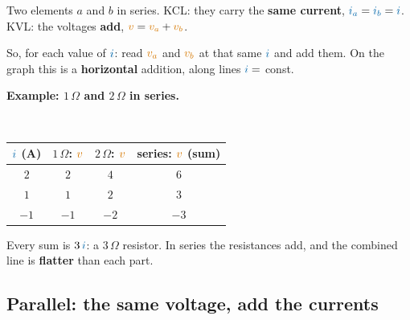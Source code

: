 \documentclass[11pt,a4paper]{article}
\newcommand{\Icol}[1]{\textcolor{ccur}{#1}}
\newcommand{\Vcol}[1]{\textcolor{cvolt}{#1}}
\newcommand{\ohm}{\,\Omega}
\newcommand{\minic}[3]{%
  \begin{scope}[shift={(#1-0.55,1.75)}, scale=\miniscale, transform shape]
    \draw (0,#2) node[ocirc] {}; \draw (0,0) node[ocirc] {};
    #3
  \end{scope}}
\newcommand{\mlab}[1]{{\Large #1}}
\newcommand{\miniscale}{0.62}
\newcommand{\mR}[4]{\draw (#1,#2) to[R, l=\mlab{#4}] (#1,#3);}
\newcommand{\mW}[2]{\draw (0,#1) -- (#2,#1); \draw (0,0) -- (#2,0);}                             %
\newcommand{\miniR}[2]{\minic{#1}{2.2}{\mW{2.2}{0.8} \mR{0.8}{2.2}{0}{#2}}}
\newcommand{\miniRsR}[3]{\minic{#1}{3.6}{\mW{3.6}{0.8} \mR{0.8}{3.6}{1.8}{#2} \mR{0.8}{1.8}{0}{#3}}}
\newcommand{\addRR}[1]{%
  \path (-0.2,-1.83) rectangle (12.2,3.812);
  \draw[vax] (0,0) -- (2.4,0) node[right=0pt, font=\tiny, text=cvolt] {$v$};
  \draw[vax] (0.9,-0.93) -- (0.9,1.612) node[above=0pt, font=\tiny, text=ccur] {$i$};
  \draw[gray!60] (1.5,-0.05) -- (1.5,0.05); \node[font=\tiny, text=gray, below] at (1.5,-0.03) {$3$};
  \draw[gray!60] (2.1,-0.05) -- (2.1,0.05); \node[font=\tiny, text=gray, below] at (2.1,-0.03) {$6$};
  \draw[gray!60] (0.85,0.62) -- (0.95,0.62); \node[font=\tiny, text=gray, left] at (0.88,0.62) {$1$};
  \draw[gray!60] (0.85,1.24) -- (0.95,1.24); \node[font=\tiny, text=gray, left] at (0.88,1.24) {$2$};
  \node[font=\scriptsize, text=metugray] at (1.2,-1.48) {$1\ohm$};
  \begin{scope}[yshift=0.112cm]\miniR{1.25}{$1\ohm$}\end{scope}
  \draw[crv] (0.6,-0.93) -- (1.4,1.55);
  \ifnum#1>1 \draw[gline] (0,0.62) -- (2.4,0.62); \node[gdot] at (1.1,0.62) {}; \fi
  \ifnum#1>2 \draw[gline] (0,1.24) -- (2.4,1.24); \node[gdot] at (1.3,1.24) {}; \fi
  \ifnum#1>2 \draw[gline] (0,-0.62) -- (2.4,-0.62); \node[gdot] at (0.7,-0.62) {}; \fi
  \draw[vax] (4.6,0) -- (7,0) node[right=0pt, font=\tiny, text=cvolt] {$v$};
  \draw[vax] (5.5,-0.93) -- (5.5,1.612) node[above=0pt, font=\tiny, text=ccur] {$i$};
  \draw[gray!60] (6.1,-0.05) -- (6.1,0.05); \node[font=\tiny, text=gray, below] at (6.1,-0.03) {$3$};
  \draw[gray!60] (6.7,-0.05) -- (6.7,0.05); \node[font=\tiny, text=gray, below] at (6.7,-0.03) {$6$};
  \draw[gray!60] (5.45,0.62) -- (5.55,0.62); \node[font=\tiny, text=gray, left] at (5.48,0.62) {$1$};
  \draw[gray!60] (5.45,1.24) -- (5.55,1.24); \node[font=\tiny, text=gray, left] at (5.48,1.24) {$2$};
  \node[font=\scriptsize, text=metugray] at (5.8,-1.48) {$2\ohm$};
  \begin{scope}[yshift=0.112cm]\miniR{5.85}{$2\ohm$}\end{scope}
  \draw[crv] (4.9,-0.93) -- (6.5,1.55);
  \ifnum#1>1 \draw[gline] (4.6,0.62) -- (7,0.62); \node[gdot] at (5.9,0.62) {}; \fi
  \ifnum#1>2 \draw[gline] (4.6,1.24) -- (7,1.24); \node[gdot] at (6.3,1.24) {}; \fi
  \ifnum#1>2 \draw[gline] (4.6,-0.62) -- (7,-0.62); \node[gdot] at (5.1,-0.62) {}; \fi
  \draw[vax] (9.2,0) -- (11.6,0) node[right=0pt, font=\tiny, text=cvolt] {$v$};
  \draw[vax] (10.1,-0.93) -- (10.1,1.612) node[above=0pt, font=\tiny, text=ccur] {$i$};
  \draw[gray!60] (10.7,-0.05) -- (10.7,0.05); \node[font=\tiny, text=gray, below] at (10.7,-0.03) {$3$};
  \draw[gray!60] (11.3,-0.05) -- (11.3,0.05); \node[font=\tiny, text=gray, below] at (11.3,-0.03) {$6$};
  \draw[gray!60] (10.05,0.62) -- (10.15,0.62); \node[font=\tiny, text=gray, left] at (10.08,0.62) {$1$};
  \draw[gray!60] (10.05,1.24) -- (10.15,1.24); \node[font=\tiny, text=gray, left] at (10.08,1.24) {$2$};
  \node[font=\scriptsize, text=metugray] at (10.4,-1.48) {series: $3\ohm$};
  \begin{scope}[yshift=0.112cm]\miniRsR{10.45}{$1\ohm$}{$2\ohm$}\end{scope}
  \ifnum#1>3 \draw[crv] (9.2,-0.93) -- (11.6,1.55); \fi
  \ifnum#1>1 \draw[gline] (9.2,0.62) -- (11.6,0.62); \node[gdot] at (10.7,0.62) {}; \fi
  \ifnum#1>2 \draw[gline] (9.2,1.24) -- (11.6,1.24); \node[gdot] at (11.3,1.24) {}; \fi
  \ifnum#1>2 \draw[gline] (9.2,-0.62) -- (11.6,-0.62); \node[gdot] at (9.5,-0.62) {}; \fi
  \node[font=\large] at (3.62,0.725) {\shortstack{$+$\\[1pt]{\tiny add $v$}}};
  \node[font=\large] at (8.22,0.725) {$=$};
}
\begin{document}
\begin{minipage}[c]{0.3\linewidth}
\centering
{}
\end{minipage}\hfill
\begin{minipage}[c]{0.66\linewidth}
Two elements $a$ and $b$ in series. KCL: they carry the \textbf{same current},
$\Icol{i_a} = \Icol{i_b} = \Icol{i}$. KVL: the voltages \textbf{add},
$\Vcol{v} = \Vcol{v_a} + \Vcol{v_b}$.

So, for each value of $\Icol{i}$: read $\Vcol{v_a}$ and $\Vcol{v_b}$ at that same $\Icol{i}$ and add
them. On the graph this is a \textbf{horizontal} addition, along lines $\Icol{i} = $ const.
\end{minipage}

\medskip
\textbf{Example: $1\ohm$ and $2\ohm$ in series.}
\begin{center}
\\[4pt]
\small
\begin{tabular}{@{}cccc@{}}
\toprule
$\Icol{i}$ (A) & $1\ohm$: $\Vcol{v}$ & $2\ohm$: $\Vcol{v}$ & series: $\Vcol{v}$ (sum)\\
\midrule
$2$ & $2$ & $4$ & $6$\\
$1$ & $1$ & $2$ & $3$\\
$-1$ & $-1$ & $-2$ & $-3$\\
\bottomrule
\end{tabular}
\end{center}
Every sum is $3\,\Icol{i}$: a $3\ohm$ resistor. In series the resistances add, and the combined
line is \textbf{flatter} than each part.

\subsection{Parallel: the same voltage, add the currents}
\end{document}
